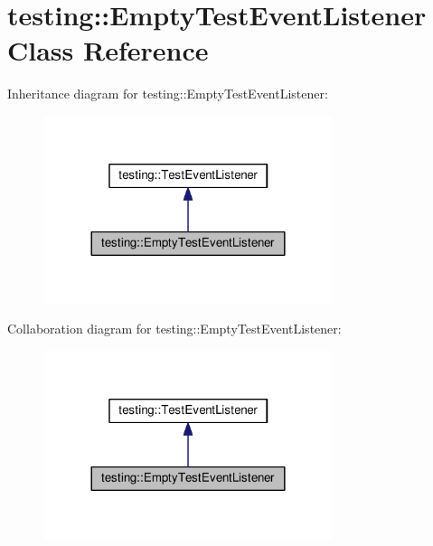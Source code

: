 \hypertarget{classtesting_1_1EmptyTestEventListener}{}\section{testing\+:\+:Empty\+Test\+Event\+Listener Class Reference}
\label{classtesting_1_1EmptyTestEventListener}


Inheritance diagram for testing\+:\+:Empty\+Test\+Event\+Listener\+:\nopagebreak
\begin{figure}[H]
\begin{center}
\leavevmode
\includegraphics[width=240pt]{classtesting_1_1EmptyTestEventListener__inherit__graph}
\end{center}
\end{figure}


Collaboration diagram for testing\+:\+:Empty\+Test\+Event\+Listener\+:\nopagebreak
\begin{figure}[H]
\begin{center}
\leavevmode
\includegraphics[width=240pt]{classtesting_1_1EmptyTestEventListener__coll__graph}
\end{center}
\end{figure}
